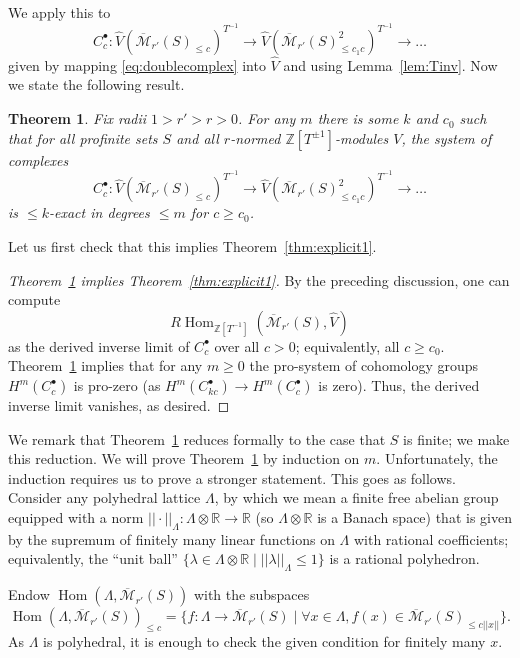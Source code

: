 \documentclass[11pt]{amsart}
\DeclareMathOperator{\Hom}{Hom}
\renewcommand*{\hat}{\widehat}
\numberwithin{equation}{section}
\newtheorem{theorem}{Theorem}
\numberwithin{theorem}{section}
\theoremstyle{definition}
\begin{document}
We apply this to
\[
C_c^\bullet: \widehat{V}(\overline{\mathcal M}_{r'}(S)_{\leq c})^{T^{-1}}\to \widehat{V}(\overline{\mathcal M}_{r'}(S)_{\leq c_1c}^2)^{T^{-1}}\to \ldots
\]
given by mapping \eqref{eq:doublecomplex} into $\hat{V}$ and using Lemma~\ref{lem:Tinv}. Now we state the following result.

\begin{theorem}\label{thm:explicit2} Fix radii $1>r'>r>0$. For any $m$ there is some $k$ and $c_0$ such that for all profinite sets $S$ and all $r$-normed $\mathbb Z[T^{\pm 1}]$-modules $V$, the system of complexes
\[
C_c^\bullet: \widehat{V}(\overline{\mathcal M}_{r'}(S)_{\leq c})^{T^{-1}}\to \widehat{V}(\overline{\mathcal M}_{r'}(S)_{\leq c_1c}^2)^{T^{-1}}\to \ldots
\]
is $\leq k$-exact in degrees $\leq m$ for $c\geq c_0$.
\end{theorem}

Let us first check that this implies Theorem~\ref{thm:explicit1}.

\begin{proof}[Theorem~\ref{thm:explicit2} implies Theorem~\ref{thm:explicit1}] By the preceding discussion, one can compute
\[
R\Hom_{\mathbb Z[T^{-1}]}(\overline{\mathcal M}_{r'}(S),\widehat{V})
\]
as the derived inverse limit of $C_c^\bullet$ over all $c>0$; equivalently, all $c\geq c_0$. Theorem~\ref{thm:explicit2} implies that for any $m\geq 0$ the pro-system of cohomology groups $H^m(C_c^\bullet)$ is pro-zero (as $H^m(C_{kc}^\bullet)\to H^m(C_c^\bullet)$ is zero). Thus, the derived inverse limit vanishes, as desired.
\end{proof}

We remark that Theorem~\ref{thm:explicit2} reduces formally to the case that $S$ is finite; we make this reduction. We will prove Theorem~\ref{thm:explicit2} by induction on $m$. Unfortunately, the induction requires us to prove a stronger statement. This goes as follows. Consider any polyhedral lattice $\Lambda$, by which we mean a finite free abelian group equipped with a norm $||\cdot||_\Lambda: \Lambda\otimes \mathbb R\to \mathbb R$ (so $\Lambda\otimes \mathbb R$ is a Banach space) that is given by the supremum of finitely many linear functions on $\Lambda$ with rational coefficients; equivalently, the ``unit ball'' $\{\lambda\in \Lambda\otimes \mathbb R\mid ||\lambda||_\Lambda\leq 1\}$ is a rational polyhedron.

Endow $\Hom(\Lambda,\overline{\mathcal M}_{r'}(S))$ with the subspaces
\[
\Hom(\Lambda,\overline{\mathcal M}_{r'}(S))_{\leq c} = \{f: \Lambda\to \overline{\mathcal M}_{r'}(S)\mid \forall x\in \Lambda, f(x)\in \overline{\mathcal M}_{r'}(S)_{\leq c||x||}\}.
\]
As $\Lambda$ is polyhedral, it is enough to check the given condition for finitely many $x$.
\end{document}
